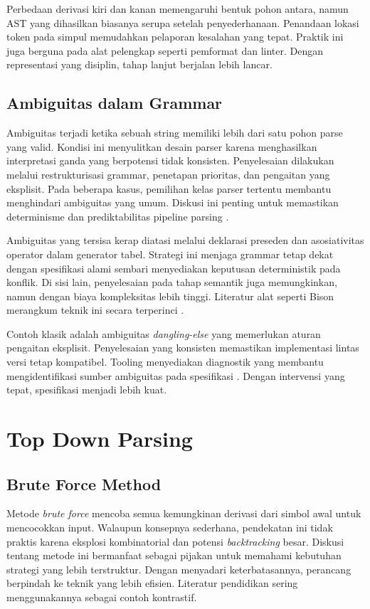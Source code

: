 \documentclass[../main.tex]{subfiles}
\begin{document}
Perbedaan derivasi kiri dan kanan memengaruhi bentuk pohon antara, namun AST yang dihasilkan biasanya serupa setelah penyederhanaan. Penandaan lokasi token pada simpul memudahkan pelaporan kesalahan yang tepat. Praktik ini juga berguna pada alat pelengkap seperti pemformat dan linter. Dengan representasi yang disiplin, tahap lanjut berjalan lebih lancar.

\subsection{Ambiguitas dalam Grammar}
Ambiguitas terjadi ketika sebuah string memiliki lebih dari satu pohon parse yang valid. Kondisi ini menyulitkan desain parser karena menghasilkan interpretasi ganda yang berpotensi tidak konsisten. Penyelesaian dilakukan melalui restrukturisasi grammar, penetapan prioritas, dan pengaitan yang eksplisit. Pada beberapa kasus, pemilihan kelas parser tertentu membantu menghindari ambiguitas yang umum. Diskusi ini penting untuk memastikan determinisme dan prediktabilitas pipeline parsing \citep{Mogensen2010}.

Ambiguitas yang tersisa kerap diatasi melalui deklarasi preseden dan asosiativitas operator dalam generator tabel. Strategi ini menjaga grammar tetap dekat dengan spesifikasi alami sembari menyediakan keputusan deterministik pada konflik. Di sisi lain, penyelesaian pada tahap semantik juga memungkinkan, namun dengan biaya kompleksitas lebih tinggi. Literatur alat seperti Bison merangkum teknik ini secara terperinci \citep{BisonManual}.

Contoh klasik adalah ambiguitas \emph{dangling-else} yang memerlukan aturan pengaitan eksplisit. Penyelesaian yang konsisten memastikan implementasi lintas versi tetap kompatibel. Tooling menyediakan diagnostik yang membantu mengidentifikasi sumber ambiguitas pada spesifikasi \citep{Mogensen2010}. Dengan intervensi yang tepat, spesifikasi menjadi lebih kuat.

\section{Top Down Parsing}
\subsection{Brute Force Method}
Metode \emph{brute force} mencoba semua kemungkinan derivasi dari simbol awal untuk mencocokkan input. Walaupun konsepnya sederhana, pendekatan ini tidak praktis karena eksplosi kombinatorial dan potensi \emph{backtracking} besar. Diskusi tentang metode ini bermanfaat sebagai pijakan untuk memahami kebutuhan strategi yang lebih terstruktur. Dengan menyadari keterbatasannya, perancang berpindah ke teknik yang lebih efisien. Literatur pendidikan sering menggunakannya sebagai contoh kontrastif.
\end{document}
